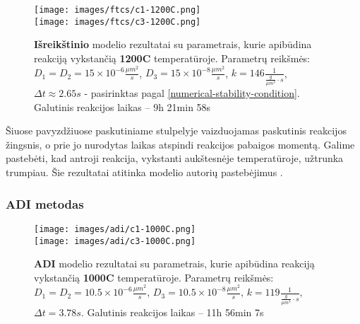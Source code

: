 \begin{figure}[h!]
  \centering
  \texttt{[image: images/ftcs/c1-1200C.png]} \\ 
  \texttt{[image: images/ftcs/c3-1200C.png]}
  \caption{\textbf{Išreikštinio} modelio rezultatai su parametrais, kurie apibūdina reakciją vykstančią \textbf{1200\degree C} temperatūroje. Parametrų reikšmės: $D_1 = D_2 = 15\times 10^{-6} \frac{\mu m^2}{s}$, $D_3 = 15\times 10^{-8} \frac{\mu m^2}{s}$, $k = 146 \frac{1}{ \frac{g}{\mu m^3}\cdot s}$, $\Delta t \approx 2.65s$ - pasirinktas pagal \eqref{numerical-stability-condition}. Galutinis reakcijos laikas -- 9h 21min 58s }
  \label{fig:ftcs-result-T-1200}
\end{figure}


Šiuose pavyzdžiuose paskutiniame stulpelyje vaizduojamas paskutinis reakcijos žingsnis, o prie jo nurodytas laikas atspindi reakcijos pabaigos momentą. Galime pastebėti, kad antroji reakcija, vykstanti aukštesnėje temperatūroje, užtrunka trumpiau. Šie rezultatai atitinka modelio autorių pastebėjimus \cite{mackeviciusCloserLookComputer2012}.

\subsubsection*{ADI metodas}

\begin{figure}[h!]
  \centering
  \texttt{[image: images/adi/c1-1000C.png]} \\ 
  \texttt{[image: images/adi/c3-1000C.png]} 
  \caption{\textbf{ADI} modelio rezultatai su parametrais, kurie apibūdina reakciją vykstančią \textbf{1000\degree C} temperatūroje. Parametrų reikšmės: $D_1 = D_2 = 10.5\times 10^{-6} \frac{\mu m^2}{s}$, $D_3 = 10.5\times 10^{-8} \frac{\mu m^2}{s}$, $k = 119 \frac{1}{ \frac{g}{\mu m^3}\cdot s}$, $\Delta t = 3.78s$. Galutinis reakcijos laikas -- 11h 56min 7s}
  \label{fig:adi-result-T-1000}
\end{figure}

